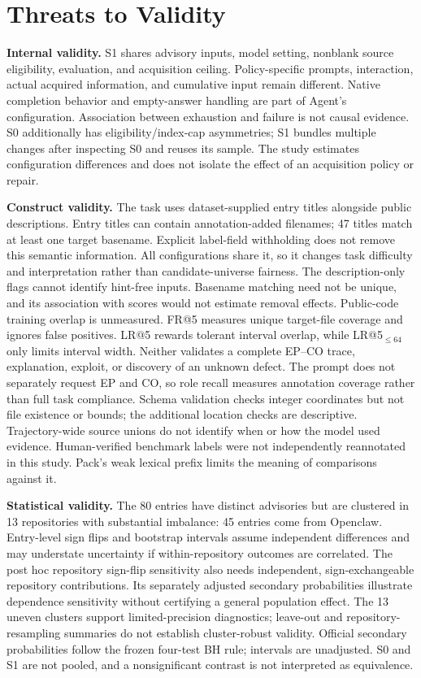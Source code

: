 \section{Threats to Validity}
\textbf{Internal validity.} S1 shares advisory inputs, model setting, nonblank source eligibility, evaluation, and acquisition ceiling. Policy-specific prompts, interaction, actual acquired information, and cumulative input remain different. Native completion behavior and empty-answer handling are part of Agent's configuration. Association between exhaustion and failure is not causal evidence. S0 additionally has eligibility/index-cap asymmetries; S1 bundles multiple changes after inspecting S0 and reuses its sample. The study estimates configuration differences and does not isolate the effect of an acquisition policy or repair.

\textbf{Construct validity.} The task uses dataset-supplied entry titles alongside public descriptions. Entry titles can contain annotation-added filenames; 47 titles match at least one target basename. Explicit label-field withholding does not remove this semantic information. All configurations share it, so it changes task difficulty and interpretation rather than candidate-universe fairness. The description-only flags cannot identify hint-free inputs. Basename matching need not be unique, and its association with scores would not estimate removal effects. Public-code training overlap is unmeasured. FR@5 measures unique target-file coverage and ignores false positives. LR@5 rewards tolerant interval overlap, while LR@5$_{\leq64}$ only limits interval width. Neither validates a complete EP--CO trace, explanation, exploit, or discovery of an unknown defect. The prompt does not separately request EP and CO, so role recall measures annotation coverage rather than full task compliance. Schema validation checks integer coordinates but not file existence or bounds; the additional location checks are descriptive. Trajectory-wide source unions do not identify when or how the model used evidence. Human-verified benchmark labels were not independently reannotated in this study. Pack's weak lexical prefix limits the meaning of comparisons against it.

\textbf{Statistical validity.} The 80 entries have distinct advisories but are clustered in 13 repositories with substantial imbalance: 45 entries come from Openclaw. Entry-level sign flips and bootstrap intervals assume independent differences and may understate uncertainty if within-repository outcomes are correlated. The post hoc repository sign-flip sensitivity also needs independent, sign-exchangeable repository contributions. Its separately adjusted secondary probabilities illustrate dependence sensitivity without certifying a general population effect. The 13 uneven clusters support limited-precision diagnostics; leave-out and repository-resampling summaries do not establish cluster-robust validity. Official secondary probabilities follow the frozen four-test BH rule; intervals are unadjusted. S0 and S1 are not pooled, and a nonsignificant contrast is not interpreted as equivalence.

